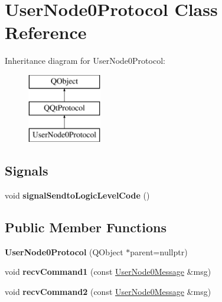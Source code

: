 \hypertarget{class_user_node0_protocol}{}\section{User\+Node0\+Protocol Class Reference}
\label{class_user_node0_protocol}
Inheritance diagram for User\+Node0\+Protocol\+:\begin{figure}[H]
\begin{center}
\leavevmode
\includegraphics[height=3.000000cm]{class_user_node0_protocol}
\end{center}
\end{figure}
\subsection*{Signals}
\begin{DoxyCompactItemize}
\item 
\mbox{\label{class_user_node0_protocol_afbc0b34bac636a6dbd922857f011bc24}} 
void {\bfseries signal\+Sendto\+Logic\+Level\+Code} ()
\end{DoxyCompactItemize}
\subsection*{Public Member Functions}
\begin{DoxyCompactItemize}
\item 
\mbox{\label{class_user_node0_protocol_a98d5fa6d68d9df2e863d3be901007639}} 
{\bfseries User\+Node0\+Protocol} (Q\+Object $\ast$parent=nullptr)
\item 
\mbox{\label{class_user_node0_protocol_a8c344e91627b535fe6e3edc07ef158e0}} 
void {\bfseries recv\+Command1} (const \mbox{\hyperlink{class_user_node0_message}{User\+Node0\+Message}} \&msg)
\item 
\mbox{\label{class_user_node0_protocol_aa6c3624adeaa8dd1cd4c3403f2765bcd}} 
void {\bfseries recv\+Command2} (const \mbox{\hyperlink{class_user_node0_message}{User\+Node0\+Message}} \&msg)
\end{DoxyCompactItemize}
